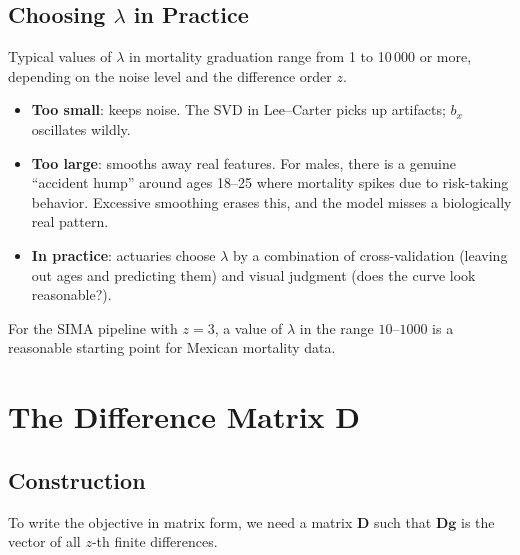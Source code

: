 \documentclass[11pt,a4paper]{article}
\begin{document}
\subsection{Choosing $\lambda$ in Practice}

\begin{application}
Typical values of $\lambda$ in mortality graduation range from 1 to 10\,000 or more, depending on the noise level and the difference order $z$.

\begin{itemize}[nosep]
  \item \textbf{Too small}: keeps noise.  The SVD in Lee--Carter picks up artifacts; $b_x$ oscillates wildly.
  \item \textbf{Too large}: smooths away real features.  For males, there is a genuine ``accident hump'' around ages 18--25 where mortality spikes due to risk-taking behavior.  Excessive smoothing erases this, and the model misses a biologically real pattern.
  \item \textbf{In practice}: actuaries choose $\lambda$ by a combination of cross-validation (leaving out ages and predicting them) and visual judgment (does the curve look reasonable?).
\end{itemize}

For the SIMA pipeline with $z=3$, a value of $\lambda$ in the range $10$--$1000$ is a reasonable starting point for Mexican mortality data.
\end{application}

\section{The Difference Matrix $\bm{D}$}

\subsection{Construction}

To write the objective in matrix form, we need a matrix $\bm{D}$ such that $\bm{D}\bm{g}$ is the vector of all $z$-th finite differences.
\end{document}
